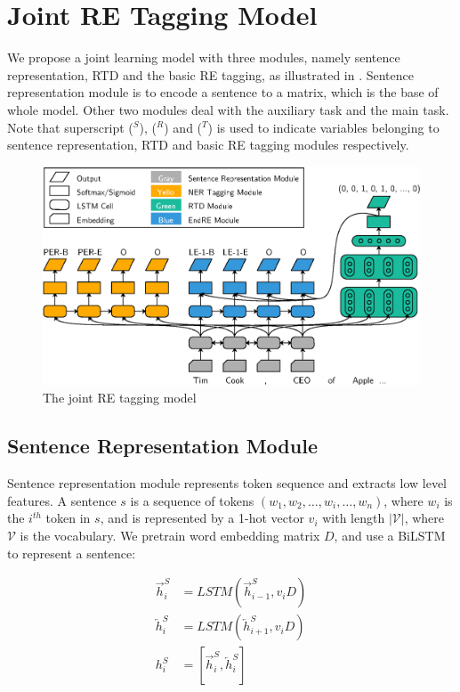 \section{Joint RE Tagging Model}
\label{sec:tagging}

We propose a joint learning model with three modules, namely
sentence representation, RTD and the basic RE tagging, 
as illustrated in . 
Sentence representation module is to encode a sentence to a matrix, which is the 
base of whole model. Other two modules deal with the auxiliary task and 
the main task. Note that superscript ($^S$), ($^R$) and ($^T$) is used
to indicate variables belonging to sentence representation,
RTD and basic RE tagging modules respectively.


\begin{figure}[th]
\centering
\includegraphics[width=\columnwidth]{pictures/model.eps}
\caption{The joint RE tagging model \label{fig:model}}
\end{figure}

\subsection{Sentence Representation Module}
Sentence representation module represents token sequence and extracts low level
features. A sentence $s$ is a sequence of tokens $(w_1, w_2, \ldots, w_i,
\ldots, w_n)$, where $w_i$ is the $i^{th}$ token in $s$, and is represented by
a 1-hot vector $v_i$ with length $|\mathcal{V}|$, where $\mathcal{V}$ is 
the vocabulary. We pretrain word embedding matrix $D$, and use a BiLSTM to
represent a sentence:

\begin{align*}
    \overrightarrow{h}_i^S &= LSTM(\overrightarrow{h}_{i-1}^S, v_iD) \nonumber \\
    \overleftarrow{h}_i^S &= LSTM(\overleftarrow{h}_{i+1}^S, v_iD) \nonumber \\
    h_i^S &= [\overrightarrow{h}_i^S, \overleftarrow{h}_i^S] \nonumber
\end{align*}

